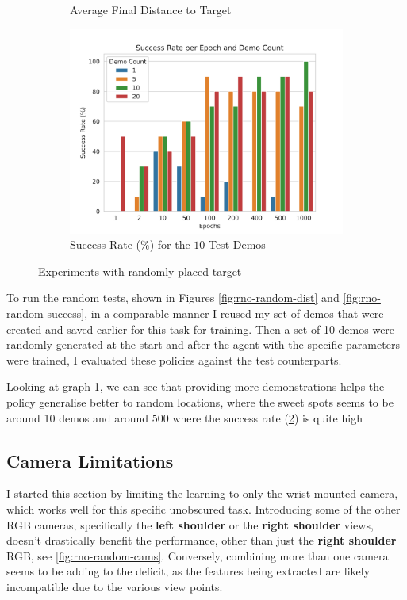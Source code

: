 \begin{figure}[htpb]
\begin{subfigure}{0.3\linewidth}
    \caption{Average Final Distance to Target}\label{subfig:rno-random-dist}
  \end{subfigure}
  \begin{subfigure}{0.3\linewidth}
    \centering
    \includegraphics[width=\linewidth]{assets/cam-comb/reach-no-obs/rno_random-success.png}
    \caption{Success Rate (\%) for the $10$ Test Demos}\label{subfig:rno-random-success}
  \end{subfigure}
  \caption{Experiments with randomly placed target}\label{fig:rno-random}
\end{figure}

To run the random tests, shown in Figures \ref{fig:rno-random-dist} and \ref{fig:rno-random-success}, in a comparable manner I reused my set of demos that were created and saved earlier for this task for training. Then a set of 10 demos were randomly generated at the start and after the agent with the specific parameters were trained, I evaluated these policies against the test counterparts.

Looking at graph \ref{subfig:rno-random-dist}, we can see that providing more demonstrations helps the policy generalise better to random locations, where the sweet spots seems to be around 10 demos and around $500$ where the success rate (\ref{subfig:rno-random-success}) is quite high

\subsection{Camera Limitations}
I started this section by limiting the learning to only the wrist mounted camera, which works well for this specific unobscured task. Introducing some of the other RGB cameras, specifically the \textbf{left shoulder} or the \textbf{right shoulder} views, doesn't drastically benefit the performance, other than just the \textbf{right shoulder} RGB, see \ref{fig:rno-random-cams}. Conversely, combining more than one camera seems to be adding to the deficit, as the features being extracted are likely incompatible due to the various view points. 

